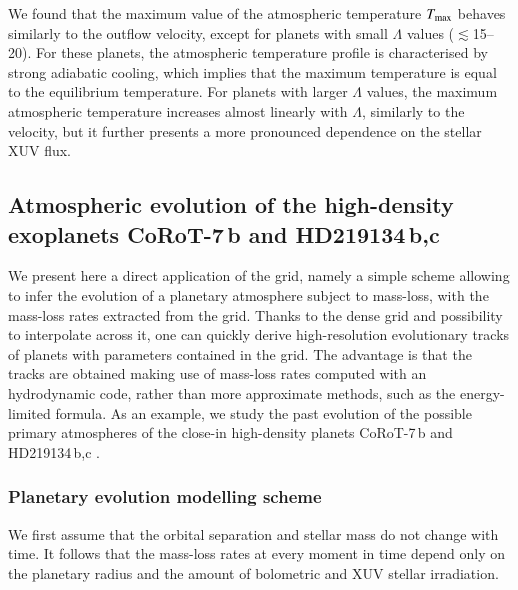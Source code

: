 \documentclass{aa}
\begin{document}
We found that the maximum value of the atmospheric temperature $T_{\rm max}$ behaves similarly to the outflow velocity, except for planets with small $\Lambda$ values ($\lesssim$15--20). For these planets, the atmospheric temperature profile is characterised by strong adiabatic cooling, which implies that the maximum temperature is equal to the equilibrium temperature. For planets with larger $\Lambda$ values, the maximum atmospheric temperature increases almost linearly with $\Lambda$, similarly to the velocity, but it further presents a more pronounced dependence on the stellar XUV flux.
%
\subsection{Atmospheric evolution of the high-density exoplanets CoRoT-7\,b and HD219134\,b,c}\label{sec:evolution}
%
We present here a direct application of the grid, namely a simple
scheme allowing to infer the evolution of a planetary atmosphere
subject to mass-loss, with the mass-loss rates extracted from the
grid. Thanks to the dense grid and possibility to interpolate
across it, one can {quickly} derive high-resolution evolutionary
tracks of planets with parameters contained in the grid. The
advantage is that the tracks are obtained making use of mass-loss
rates computed with an hydrodynamic code, rather than more
approximate methods, such as the energy-limited formula. As an
example, we study the past evolution of the possible primary
atmospheres of the close-in high-density planets CoRoT-7\,b
\citep{leger2009,valencia2010,leitzinger2011,mura2011,barros2014}
and HD219134\,b,c \citep{motalebi2015,vogt2015,gillon2017}.

%
\subsubsection{Planetary evolution modelling scheme}
%
{We first assume that the orbital separation and stellar mass do
not change with time. It follows that the mass-loss rates at every
moment in time depend only on the planetary radius and the amount
of bolometric and XUV stellar irradiation.}
\end{document}
